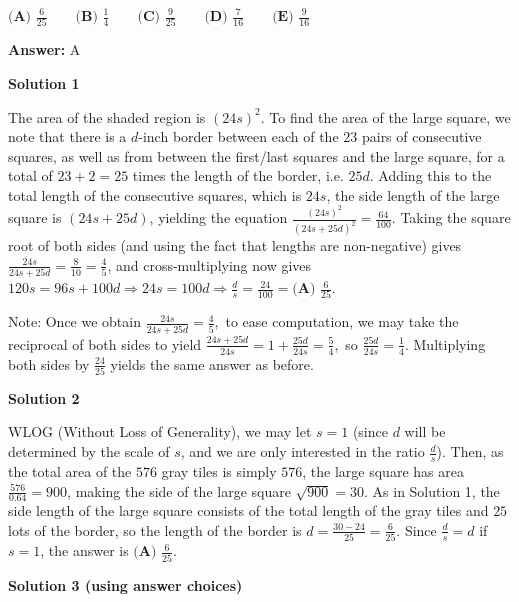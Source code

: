 \begin{enumerate}
$\textbf{(A) }\frac6{25} \qquad \textbf{(B) }\frac14 \qquad \textbf{(C) }\frac9{25} \qquad \textbf{(D) }\frac7{16} \qquad \textbf{(E) }\frac9{16}$

 \textbf{Answer: }A



\textbf{Solution 1}

The area of the shaded region is $(24s)^2$. To find the area of the large square, we note that there is a $d$-inch border between each of the $23$ pairs of consecutive squares, as well as from between the first/last squares and the large square, for a total of $23+2 = 25$ times the length of the border, i.e. $25d$. Adding this to the total length of the consecutive squares, which is $24s$, the side length of the large square is $(24s+25d)$, yielding the equation $\frac{(24s)^2}{(24s+25d)^2}=\frac{64}{100}$. Taking the square root of both sides (and using the fact that lengths are non-negative) gives $\frac{24s}{24s+25d}=\frac{8}{10} = \frac{4}{5}$, and cross-multiplying now gives $120s = 96s + 100d \Rightarrow 24s = 100d \Rightarrow \frac{d}{s} = \frac{24}{100} = \boxed{\textbf{(A) }\frac{6}{25}}$.

 
Note: Once we obtain $\frac{24s}{24s+25d} = \frac{4}{5},$ to ease computation, we may take the reciprocal of both sides to yield $\frac{24s+25d}{24s} = 1 + \frac{25d}{24s} = \frac{5}{4},$ so $\frac{25d}{24s} = \frac{1}{4}.$ Multiplying both sides by $\frac{24}{25}$ yields the same answer as before. 

 



\textbf{Solution 2}

WLOG (Without Loss of Generality), we may let $s=1$ (since $d$ will be determined by the scale of $s$, and we are only interested in the ratio $\frac{d}{s}$). Then, as the total area of the $576$ gray tiles is simply $576$, the large square has area $\frac{576}{0.64} = 900$, making the side of the large square $\sqrt{900}=30$. As in Solution 1, the side length of the large square consists of the total length of the gray tiles and $25$ lots of the border, so the length of the border is $d = \frac{30-24}{25} = \frac{6}{25}$. Since $\frac{d}{s}=d$ if $s=1$, the answer is $\boxed{\textbf{(A) }\frac{6}{25}}$.

 



\textbf{Solution 3 (using answer choices)}


\end{enumerate}
